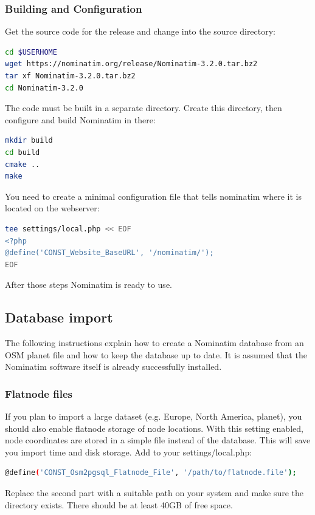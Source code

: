 \subsubsection{Building and Configuration}
Get the source code for the release and change into the source directory:
\begin{lstlisting}[language=bash,breaklines=true]
cd $USERHOME
wget https://nominatim.org/release/Nominatim-3.2.0.tar.bz2
tar xf Nominatim-3.2.0.tar.bz2
cd Nominatim-3.2.0
\end{lstlisting}
The code must be built in a separate directory. Create this directory, then configure and build
Nominatim in there:
\begin{lstlisting}[language=bash,breaklines=true]
mkdir build
cd build
cmake ..
make
\end{lstlisting}
You need to create a minimal configuration file that tells nominatim where it is located on the
webserver:
\begin{lstlisting}[language=bash,breaklines=true]
tee settings/local.php << EOF
<?php
@define('CONST_Website_BaseURL', '/nominatim/');
EOF
\end{lstlisting}
After those steps Nominatim is ready to use.
\subsection{Database import}
The following instructions explain how to create a Nominatim database from an OSM planet file
and how to keep the database up to date. It is assumed that the Nominatim software itself is already successfully installed.
\subsubsection{Flatnode files}
If you plan to import a large dataset (e.g. Europe, North America, planet), you should also
enable flatnode storage of node locations. With this setting enabled, node coordinates are
stored in a simple file instead of the database. This will save you import time and disk storage.
Add to your settings/local.php:
\begin{lstlisting}[language=bash,breaklines=true]
@define('CONST_Osm2pgsql_Flatnode_File', '/path/to/flatnode.file');
\end{lstlisting}
Replace the second part with a suitable path on your system and make sure the directory exists.
There should be at least 40GB of free space.
